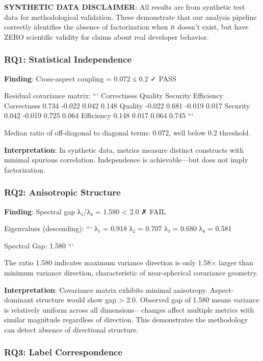 
\textbf{SYNTHETIC DATA DISCLAIMER}: All results are from synthetic test data for methodological validation. These demonstrate that our analysis pipeline correctly identifies the absence of factorization when it doesn't exist, but have ZERO scientific validity for claims about real developer behavior.

\subsubsection{RQ1: Statistical Independence}

\textbf{Finding}: Cross-aspect coupling = 0.072 ≤ 0.2 ✓ PASS

Residual covariance matrix:
```
              Correctness  Quality  Security  Efficiency
Correctness     0.734     -0.022    0.042      0.148
Quality        -0.022      0.681   -0.019      0.017
Security        0.042     -0.019    0.725      0.064
Efficiency      0.148      0.017    0.064      0.745
```

Median ratio of off-diagonal to diagonal terms: 0.072, well below 0.2 threshold.

\textbf{Interpretation}: In synthetic data, metrics measure distinct constructs with minimal spurious correlation. Independence is achievable—but does not imply factorization.

\subsubsection{RQ2: Anisotropic Structure}

\textbf{Finding}: Spectral gap λ₁/λ₄ = 1.580 < 2.0 ✗ FAIL

Eigenvalues (descending):
```
λ₁ = 0.918
λ₂ = 0.707
λ₃ = 0.680
λ₄ = 0.581

Spectral Gap: 1.580
```

The ratio 1.580 indicates maximum variance direction is only 1.58× larger than minimum variance direction, characteristic of near-spherical covariance geometry.

\textbf{Interpretation}: Covariance matrix exhibits minimal anisotropy. Aspect-dominant structure would show gap > 2.0. Observed gap of 1.580 means variance is relatively uniform across all dimensions—changes affect multiple metrics with similar magnitude regardless of direction. This demonstrates the methodology can detect absence of directional structure.

\subsubsection{RQ3: Label Correspondence}

